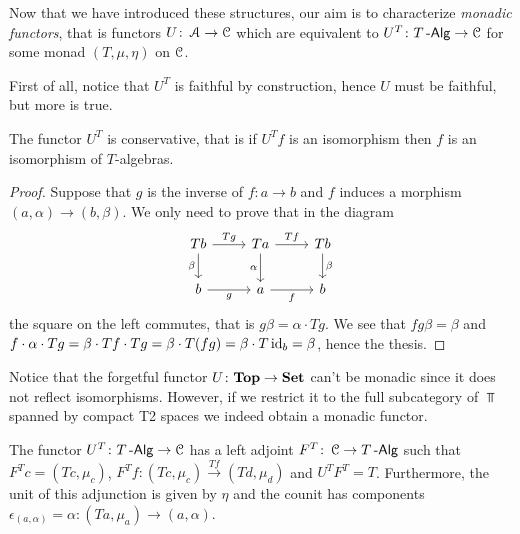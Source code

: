 \documentclass[a4paper,11pt,oneside,openany]{scrbook}
\begin{document}
Now that we have introduced these structures, our aim is to characterize \emph{monadic functors}, that is functors $U\colon\operatorname{\mathcal{A}}\rightarrow\operatorname{\mathcal{C}}$ which are equivalent to $U^T\colon T\operatorname{-\mathsf{Alg}}\rightarrow\operatorname{\mathcal{C}}$ for some monad $(T,\mu,\eta)$ on $\operatorname{\mathcal{C}}$.

First of all, notice that $U^T$ is faithful by construction, hence $U$ must be faithful, but more is true.

\begin{lemma}
	The functor $U^T$ is conservative, that is if $U^Tf$ is an isomorphism then $f$ is an isomorphism of $T$-algebras.
\end{lemma}
\begin{proof}
	Suppose that $g$ is the inverse of $f\colon a\rightarrow b$ and $f$ induces
	a morphism $(a,\alpha)\rightarrow (b,\beta)$. We only need to prove that in
	the diagram
	\[
		\begin{tikzcd}
			Tb\arrow["\beta"']{d}\arrow["Tg"]{r}
			& Ta\arrow["\alpha"']{d}\arrow["Tf"]{r}
			& Tb\arrow["\beta"]{d} \\
			b\arrow["g"']{r}
			& a\arrow["f"']{r}
			& b
		\end{tikzcd}
	\]
	the square on the left commutes, that is $g\beta=\alpha\cdot Tg$.
	We see that $fg\beta=\beta$ and $f\cdot\alpha\cdot Tg=\beta\cdot Tf\cdot
		Tg=\beta\cdot T(fg)=\beta\cdot T\operatorname{id}_b=\beta$, hence the thesis.
\end{proof}
\begin{rmk}
	Notice that the forgetful functor $U\colon{\normalfont\textbf{Top}}\to{\normalfont\textbf{Set}}$ can't be monadic
	since it does not reflect isomorphisms. However, if we restrict it to
	the full subcategory of $\Top$ spanned by compact T2 spaces we indeed
	obtain a monadic functor.
\end{rmk}
\begin{prop}
	The functor $U^T\colon T\operatorname{-\mathsf{Alg}}\rightarrow\operatorname{\mathcal{C}}$ has a left adjoint $F^T\colon\operatorname{\mathcal{C}}\rightarrow T\operatorname{-\mathsf{Alg}}$ such that $F^Tc=(Tc,\mu_{c})$, $F^Tf\colon(Tc,\mu_{c})\xrightarrow{Tf} (Td,\mu_{d})$ and $U^TF^T=T$. Furthermore, the unit of this adjunction is given by $\eta$ and the counit has components $\epsilon_{(a,\alpha)}=\alpha\colon(Ta,\mu_a)\to(a,\alpha)$.
\end{prop}
\end{document}
